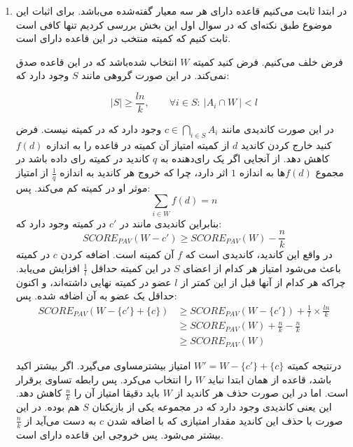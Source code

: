 \documentclass[12pt]{article}
\begin{document}
\begin{enumerate}
{        بنابراین نتیجه می‌شود قاعده 
        لزوما 
        را برآورده نمی‌کند.
    }
    \item {
        در ابتدا ثابت می‌کنیم قاعده
        دارای هر سه معیار گفته‌شده می‌باشد. برای اثبات این موضوع طبق
        نکته‌ای که در سوال اول این بخش بررسی کردیم تنها کافی است ثابت کنیم
        که کمیته منتخب در این قاعده دارای
        است. 
        
        فرض خلف می‌کنیم. فرض کنید کمیته $W$
        انتخاب شده‌باشد که در این قاعده صدق نمی‌کند. در این صورت گروهی
        مانند 
        $S$
        وجود دارد که:

        \[
        |S| \ge \frac{ln}{k}, \qquad \forall i \in S: \: \left| A_i \cap W \ \right| < l
        \]

        در این صورت کاندیدی مانند $c \in \bigcap_{i\in S} A_i$
        وجود دارد که در کمیته نیست. فرض کنید خارج کردن
        کاندید $d$
        از کمیته امتیاز آن کمیته در قاعده 
        را به اندازه $f(d)$
        کاهش دهد. از آنجایی اگر یک رای‌دهنده به $q$
        کاندید در کمیته رای داده باشد در مجموع
        $f(d)$ها 
        به اندازه $1$
         اثر دارد، چرا که خروج هر کاندید
         به اندازه $\frac{1}{q}$
         از امتیاز موثر او در کمیته کم می‌کند. پس:
         \[
         \sum_{i \in W} f(d) = n
         \]
         بنابراین کاندیدی مانند در $c'$
         در کمیته وجود دارد که:
         \[
         SCORE_{PAV}(W - {c'}) \ge SCORE_{PAV}(W) - \frac{n}{k}
         \]
         در واقع این کاندید، کاندیدی است که $f$
         آن کمینه است. اضافه کردن $c$
         در کمیته باعث می‌شود امتیاز هر کدام از اعضای $S$
         در این کمیته حداقل $\frac{1}{l}$
         افزایش می‌یابد. چراکه هر کدام از آنها قبل از این کمتر از $l$
         عضو در کمیته نهایی داشته‌اند، و اکنون حداقل یک عضو به آن اضافه شده. پس:
         \begin{align*}
         SCORE_{PAV}(W - \{c'\} + \{c\}) &\ge SCORE_{PAV}(W- \{c'\}) + \frac{1}{l} \times \frac{ln}{k} \\
            &\ge SCORE_{PAV}(W) + \frac{n}{k} - \frac{n}{k} \\
            &\ge SCORE_{PAV}(W)
         \end{align*}
 
         درنتیجه کمیته
         $W' = W - \{c'\} + \{c\}$
         امتیاز بیشترمساوی 
         می‌گیرد. اگر بیشتر اکید باشد، قاعده 
         از همان ابتدا نباید $W$
         را انتخاب می‌کرد. پس رابطه تساوی برقرار است.
         اما در این صورت حذف هر کاندید از $W$
         باید دقیقا امتیاز آن را
         $\frac{n}{k}$
         کاهش دهد. این یعنی کاندیدی وجود دارد که در مجموعه یکی از بازیکنان 
         $S$
         هم بوده. در این صورت با حذف این کاندید مقدار امتیازی
         که با اضافه شدن $c$
         به دست می‌آید از
         $\frac{n}{k}$
         بیشتر می‌شود. پس خروجی این قاعده دارای
         است.

}
\end{enumerate}
\end{document}

